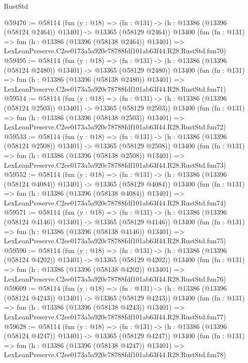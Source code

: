 \begin{lexlean}{RustStd}
\begin{coremodule}
@59476 := @58114
    (fun (y : @18) =>
    (fn : @131) -> (h : @13386 (@13396 (@58124 @2464)) @13401) -> @13365 (@58129 @2464))
    @13400
    (fun (fn : @131) =>
    fun (h : @13386 (@13396 (@58138 @2464)) @13401) =>
    LexLeanPreserve.C2ee0173a5a920c78788fdf101ab63f44.R28.RustStd.fun70)
@59495 := @58114
    (fun (y : @18) =>
    (fn : @131) -> (h : @13386 (@13396 (@58124 @2480)) @13401) -> @13365 (@58129 @2480))
    @13400
    (fun (fn : @131) =>
    fun (h : @13386 (@13396 (@58138 @2480)) @13401) =>
    LexLeanPreserve.C2ee0173a5a920c78788fdf101ab63f44.R28.RustStd.fun71)
@59514 := @58114
    (fun (y : @18) =>
    (fn : @131) -> (h : @13386 (@13396 (@58124 @2503)) @13401) -> @13365 (@58129 @2503))
    @13400
    (fun (fn : @131) =>
    fun (h : @13386 (@13396 (@58138 @2503)) @13401) =>
    LexLeanPreserve.C2ee0173a5a920c78788fdf101ab63f44.R28.RustStd.fun72)
@59533 := @58114
    (fun (y : @18) =>
    (fn : @131) -> (h : @13386 (@13396 (@58124 @2508)) @13401) -> @13365 (@58129 @2508))
    @13400
    (fun (fn : @131) =>
    fun (h : @13386 (@13396 (@58138 @2508)) @13401) =>
    LexLeanPreserve.C2ee0173a5a920c78788fdf101ab63f44.R28.RustStd.fun73)
@59552 := @58114
    (fun (y : @18) =>
    (fn : @131) -> (h : @13386 (@13396 (@58124 @4084)) @13401) -> @13365 (@58129 @4084))
    @13400
    (fun (fn : @131) =>
    fun (h : @13386 (@13396 (@58138 @4084)) @13401) =>
    LexLeanPreserve.C2ee0173a5a920c78788fdf101ab63f44.R28.RustStd.fun74)
@59571 := @58114
    (fun (y : @18) =>
    (fn : @131) -> (h : @13386 (@13396 (@58124 @4146)) @13401) -> @13365 (@58129 @4146))
    @13400
    (fun (fn : @131) =>
    fun (h : @13386 (@13396 (@58138 @4146)) @13401) =>
    LexLeanPreserve.C2ee0173a5a920c78788fdf101ab63f44.R28.RustStd.fun75)
@59590 := @58114
    (fun (y : @18) =>
    (fn : @131) -> (h : @13386 (@13396 (@58124 @4202)) @13401) -> @13365 (@58129 @4202))
    @13400
    (fun (fn : @131) =>
    fun (h : @13386 (@13396 (@58138 @4202)) @13401) =>
    LexLeanPreserve.C2ee0173a5a920c78788fdf101ab63f44.R28.RustStd.fun76)
@59609 := @58114
    (fun (y : @18) =>
    (fn : @131) -> (h : @13386 (@13396 (@58124 @4243)) @13401) -> @13365 (@58129 @4243))
    @13400
    (fun (fn : @131) =>
    fun (h : @13386 (@13396 (@58138 @4243)) @13401) =>
    LexLeanPreserve.C2ee0173a5a920c78788fdf101ab63f44.R28.RustStd.fun77)
@59628 := @58114
    (fun (y : @18) =>
    (fn : @131) -> (h : @13386 (@13396 (@58124 @4247)) @13401) -> @13365 (@58129 @4247))
    @13400
    (fun (fn : @131) =>
    fun (h : @13386 (@13396 (@58138 @4247)) @13401) =>
    LexLeanPreserve.C2ee0173a5a920c78788fdf101ab63f44.R28.RustStd.fun78)

\end{coremodule}
\end{lexlean}
